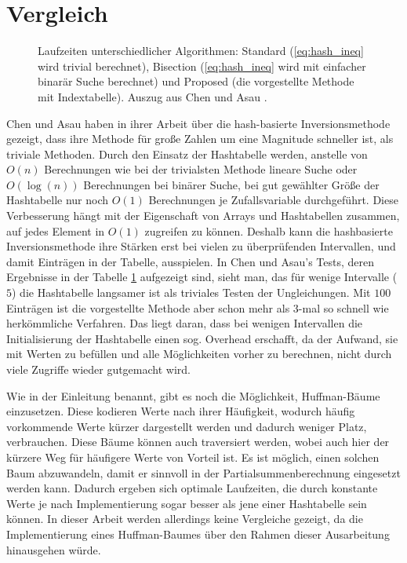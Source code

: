 \section{Vergleich}
\begin{figure}
    \centering
    \def\svgwidth{\columnwidth}
    \scalebox{1}{}
    \caption{Laufzeiten unterschiedlicher Algorithmen: Standard (\eqref{eq:hash_ineq} 
        wird trivial berechnet), Bisection (\eqref{eq:hash_ineq} wird mit einfacher 
        binarär Suche berechnet) und Proposed (die vorgestellte Methode mit 
        Indextabelle). Auszug aus Chen und Asau \cite{chen_asau-generating_random_variates-1974}.}
    \label{fig:computationTimeComp}
\end{figure}
Chen und Asau haben in ihrer Arbeit über die hash-basierte Inversionsmethode 
gezeigt, dass ihre Methode für große Zahlen um eine Magnitude schneller ist, 
als triviale Methoden. Durch den Einsatz der Hashtabelle werden, anstelle von 
$O(n)$ Berechnungen wie bei der trivialsten Methode lineare Suche oder $O(\log
(n))$ Berechnungen bei binärer Suche, bei gut gewählter Größe der Hashtabelle 
nur noch $O(1)$ Berechnungen je Zufallsvariable durchgeführt. Diese Verbesserung 
hängt mit der 
Eigenschaft von Arrays und Hashtabellen zusammen, auf jedes Element in $O(1)$ 
zugreifen zu können. Deshalb kann die hashbasierte Inversionsmethode ihre 
Stärken erst bei vielen zu überprüfenden Intervallen, und damit Einträgen in 
der Tabelle, ausspielen. In Chen und Asau's Tests, deren Ergebnisse in der Tabelle 
\ref{fig:computationTimeComp} aufgezeigt sind, sieht man, das für wenige 
Intervalle ($5$) die Hashtabelle langsamer ist als triviales Testen der 
Ungleichungen. Mit $100$ Einträgen ist die vorgestellte Methode aber schon mehr 
als $3$-mal so schnell wie herkömmliche Verfahren. Das liegt daran, dass bei 
wenigen Intervallen die Initialisierung der Hashtabelle einen sog. Overhead 
erschafft, da der Aufwand, sie mit Werten zu befüllen und alle Möglichkeiten 
vorher zu berechnen, nicht durch viele Zugriffe wieder gutgemacht wird.

Wie in der Einleitung benannt, gibt es noch die Möglichkeit, Huffman-Bäume 
einzusetzen. Diese kodieren Werte nach ihrer Häufigkeit, wodurch häufig 
vorkommende Werte kürzer dargestellt werden und dadurch weniger Platz, verbrauchen. 
Diese Bäume können auch traversiert werden, wobei auch hier der kürzere Weg für 
häufigere Werte von Vorteil ist. Es ist möglich, einen solchen Baum abzuwandeln, 
damit er sinnvoll in der Partialsummenberechnung eingesetzt werden kann. Dadurch 
ergeben sich optimale Laufzeiten, die durch konstante Werte je nach Implementierung 
sogar besser als jene einer Hashtabelle sein können. In dieser Arbeit werden 
allerdings keine Vergleiche gezeigt, da die Implementierung eines Huffman-Baumes 
über den Rahmen dieser Ausarbeitung hinausgehen würde.

